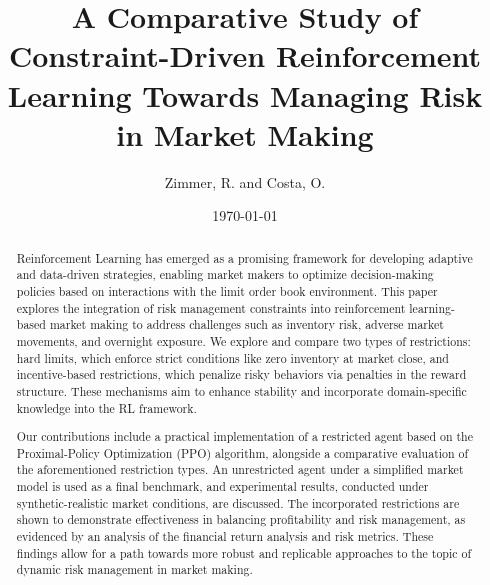 \title{A Comparative Study of Constraint-Driven Reinforcement Learning Towards Managing Risk in Market Making}
\author{Zimmer, R. and Costa, O.}
\date{\today}

\maketitle

\begin{abstract}
    Reinforcement Learning has emerged as a promising framework for developing adaptive and data-driven strategies,
    enabling market makers to optimize decision-making policies based on interactions with the limit order book environment.
    This paper explores the integration of risk management constraints into reinforcement learning-based market making to address challenges
    such as inventory risk, adverse market movements, and overnight exposure.
    We explore and compare two types of restrictions: 
    hard limits, which enforce strict conditions like zero inventory at market close,
    and incentive-based restrictions, which penalize risky behaviors via penalties in the reward structure.
    These mechanisms aim to enhance stability and incorporate domain-specific knowledge into the RL framework.

    Our contributions include a practical implementation of a restricted agent based on the Proximal-Policy Optimization (PPO) algorithm,
    alongside a comparative evaluation of the aforementioned restriction types.
    An unrestricted agent under a simplified market model is used as a final benchmark,
    and experimental results, conducted under synthetic-realistic market conditions, are discussed.
    The incorporated restrictions are shown to demonstrate effectiveness in balancing profitability and risk management,
    as evidenced by an analysis of the financial return analysis and risk metrics.
    These findings allow for a path towards more robust and replicable approaches to the topic of dynamic risk management in market making.
\end{abstract}
